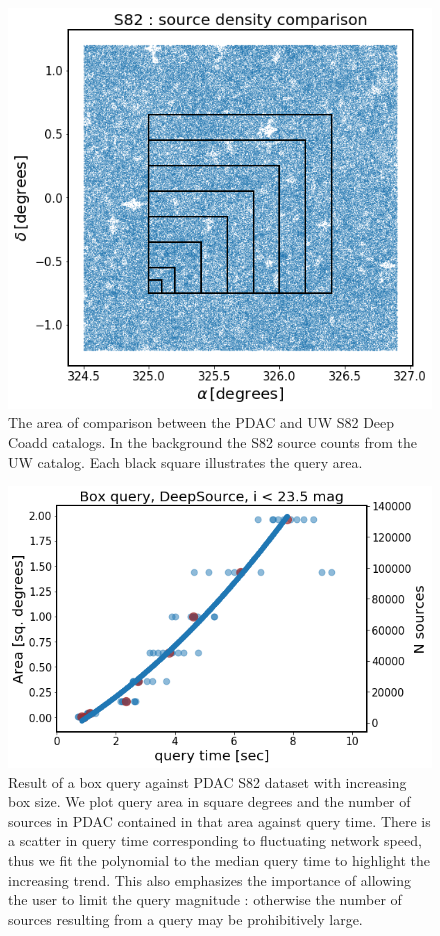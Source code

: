 \documentclass[DM,lsstdraft,toc,usenatbib]{lsstdoc}
\begin{document}
\begin{figure}
\includegraphics[width=\textwidth]{figs/Box_area_comparison}
\caption{The area of comparison between the PDAC and UW S82 Deep Coadd catalogs. In the background the S82 source counts from the UW catalog. Each black square illustrates the query area.}
\label{fig:box_area_illustrate}
\end{figure}


\begin{figure}
\includegraphics[width=\textwidth]{figs/Box_query_deepsource_i_lt_235}
\caption{Result of a box query against PDAC S82 dataset with increasing box size. We plot query area in square degrees and the number of sources in PDAC contained in that area against  query time. There is a scatter in query time corresponding to fluctuating network speed, thus we fit the polynomial to the median query time to highlight the increasing trend. This also emphasizes the importance of allowing the user to limit the query magnitude : otherwise the number of sources resulting from a query may be prohibitively large. }
\label{fig:box_query_time}
\end{figure}
\end{document}
